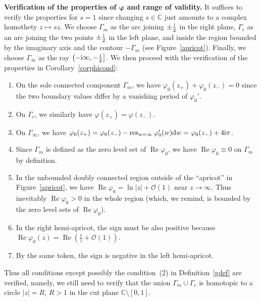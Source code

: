 \documentclass[pdftex]{sigma}
\numberwithin{equation}{section}
\theoremstyle{definition}
\def\le{\left}
\def\ri{\right}
\def \d{{\mathrm d}}
\def\res{\mathop{\mathrm {res}}}
\def\C{{\mathbb C}}
\def \Re{\operatorname{Re} }
\begin{document}
{\bf Verification of the properties of $\boldsymbol{\varphi}$ and range of validity.}
It suffices to verify the properties for $s=1$ since changing $s\in \C$ just amounts to a complex homothety $z\mapsto sz$.
We choose $\Gamma_m$ as the arc joining $\pm \frac {\rm i} 2$ in the right plane, $\Gamma_c$ as an arc joining the two points $\pm \frac {\rm i} 2$ in the left plane, and inside the region bounded by the imaginary axis and the contour $-\Gamma_m$ (see Figure~\ref{apricot}). Finally, we choose $\Gamma_\infty$ as the ray $\bigl(-{\rm i}\infty, -\frac {\rm i}2\bigr]$.
We then proceed with the verification of the properties in Corollary~\ref{corphicond}:
\begin{enumerate}\itemsep=0pt
\item[(1)] On the sole connected component $\Gamma_m$, we have $\varphi_0(z_+)+ \varphi_0(z_-)=0$ since the two boundary values differ by a vanishing period of $\varphi_0'$.
\item[(2)] On $\Gamma_c$, we similarly have $\varphi(z_+)=\varphi(z_-)$.
\item[(3)] On $\Gamma_\infty$, we have $\varphi_0(z_+) = \varphi_0(z_-) - \res_{w=\infty} \varphi_0'(w)\d w =\varphi_0(z_-)+4{\rm i}\pi $.
\item[(4)] Since $\Gamma_m$ is defined as the zero level set of $\Re \varphi_0$, we have $\Re \varphi_0\equiv 0$ on $\Gamma_m$ by definition.
\item[(5)] In the unbounded doubly connected region outside of the ``apricot'' in Figure~\ref{apricot}, we have $\Re \varphi_0 = \ln |z| + \mathcal O(1)$ near $z\to \infty$. Thus inevitably $\Re \varphi_0>0$ in the whole region (which, we remind, is bounded by the zero level sets of $\Re \varphi_0$).
\item[(5)] In the right hemi-apricot, the sign must be also positive because $\Re \varphi_0(z) = \Re\le(\frac 1 z+ \mathcal O(1)\ri)$.
\item[(6)] By the same token, the sign is negative in the left hemi-apricot.
\end{enumerate}
 Thus all conditions except possibly the condition~(2) in Definition~\ref{gdef} are verified, namely, we still need to verify that the union $\Gamma_m\cup \Gamma_c$ is homotopic to a circle $|z|=R$, $R>1$ in the cut plane $\C\setminus [0,1]$.
\end{document}
